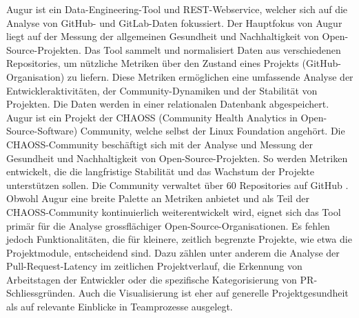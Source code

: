 Augur ist ein Data-Engineering-Tool und REST-Webservice, welcher sich auf die Analyse von GitHub- und GitLab-Daten fokussiert. Der Hauptfokus von Augur liegt auf der Messung der allgemeinen Gesundheit und Nachhaltigkeit von Open-Source-Projekten. Das Tool sammelt und normalisiert Daten aus verschiedenen Repositories, um nützliche Metriken über den Zustand eines Projekts (GitHub-Organi\-sation) zu liefern. Diese Metriken ermöglichen eine umfassende Analyse der Entwickleraktivitäten, der Community-Dynamiken und der Stabilität von Projekten. Die Daten werden in einer relationalen Datenbank abgespeichert. Augur ist ein Projekt der CHAOSS (Community Health Analytics in Open-Source-Software) Community, welche selbst der Linux Foundation angehört. Die CHAOSS-Community beschäftigt sich mit der Analyse und Messung der Gesundheit und Nachhaltigkeit von Open-Source-Projekten. So werden Metriken entwickelt, die die langfristige Stabilität und das Wachstum der Projekte unterstützen sollen. Die Community verwaltet über 60 Repositories auf GitHub \parencite{noauthor_chaoss_nodate}.
Obwohl Augur eine breite Palette an Metriken anbietet und als Teil der CHAOSS-Community kontinuierlich weiterentwickelt wird, eignet sich das Tool primär für die Analyse grossflächiger Open-Source-Organisationen. Es fehlen jedoch Funktionalitäten, die für kleinere, zeitlich begrenzte Projekte, wie etwa die Projektmodule, entscheidend sind. Dazu zählen unter anderem die Analyse der Pull-Request-Latency im zeitlichen Projektverlauf, die Erkennung von Arbeitstagen der Entwickler oder die spezifische Kategorisierung von PR-Schliessgründen. Auch die Visualisierung ist eher auf generelle Projektgesundheit als auf relevante Einblicke in Teamprozesse ausgelegt. \parencite{noauthor_about_nodate-1}\parencite{noauthor_chaossaugur_nodate}


